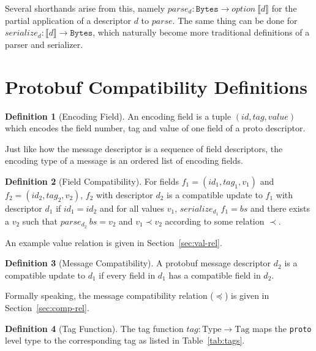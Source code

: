 \documentclass[11pt]{article}
\theoremstyle{definition}
\newtheorem{definition}{Definition}[section]
\theoremstyle{plain}
\begin{document}
Several shorthands arise from this, namely $parse_d : \mathtt{Bytes} \rightarrow option\
	\llbracket d \rrbracket$ for the partial application of a descriptor $d$ to
$parse$. The same thing can be done for $serialize_d : \llbracket d \rrbracket \rightarrow
	\mathtt{Bytes}$, which naturally become more traditional definitions of a parser and serializer.

\section{Protobuf Compatibility Definitions}

\begin{definition}[Encoding Field]
	An encoding field is a tuple $(id, tag, value)$ which encodes the field
	number, tag and value of one field of a proto descriptor.
\end{definition}

Just like how the message descriptor is a sequence of field descriptors, the
encoding type of a message is an ordered list of encoding fields.
\\
\begin{definition}[Field Compatibility]
	For fields $f_1 = (id_1, tag_1, v_1)$ and $f_2 = (id_2, tag_2, v_2)$, $f_2$
	with descriptor $d_2$ is a compatible update to $f_1$ with descriptor $d_1$ if
	$id_1 = id_2$ and for all values $v_1$, $serialize_{d_1}\ f_1 = bs$ and there
	exists a $v_2$ such that $parse_{d_2}\ bs = v_2$ and $v_1 \prec v_2$ according to
	some relation $\prec$.
\end{definition}

An example value relation is given in Section~\ref{sec:val-rel}.
\\
\begin{definition}[Message Compatibility]
	A protobuf message descriptor $d_2$ is a compatible update to $d_1$ if every
	field in $d_1$ has a compatible field in $d_2$.
\end{definition}

Formally speaking, the message compatibility relation ($\preceq$) is given in
Section~\ref{sec:comp-rel}.
\\
\begin{definition}[Tag Function]
  The tag function $tag : \text{Type} \rightarrow \text{Tag}$ maps the \texttt{proto}
  level type to the corresponding tag as listed in Table~\ref{tab:tags}.
\end{definition}
\end{document}

